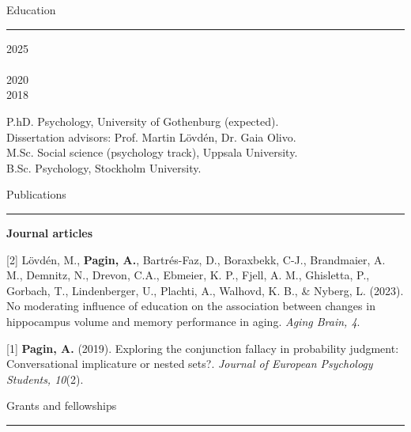 \documentclass[10pt]{article}
\newcommand{\RR}{\textcolor{grayrule}{\rule[3mm]{\textwidth}{0.5pt}}}
\begin{document}
{\large Education} \\
\vspace{-.3cm}\RR 

\begin{minipage}[t]{0.075\linewidth}
2025 \\ \\
2020 \\ 
2018
\end{minipage} 
\begin{minipage}[t]{0.92\linewidth}P.hD. Psychology, University of Gothenburg (expected).\\ 
{\footnotesize Dissertation advisors: Prof. Martin Lövdén, Dr. Gaia Olivo.} \\
M.Sc. Social science (psychology track), Uppsala University. \\
\normalsize B.Sc. Psychology, Stockholm University. \\
\end{minipage}

{\large Publications} \\
\vspace{-.3cm}\RR 

\textbf{Journal articles}

\begin{hangparas}{0.4in}{1}
\vspace{-0.6em}
[2] Lövdén, M., \textbf{Pagin, A.}, Bartrés-Faz, D., Boraxbekk, C-J., Brandmaier, A. M., Demnitz, N., Drevon, C.A., Ebmeier, K. P., Fjell, A. M., Ghisletta, P., Gorbach, T., Lindenberger, U., Plachti, A., Walhovd, K. B., \& Nyberg, L. (2023). No moderating influence of education on the association between changes in hippocampus volume and memory performance in aging. \emph{Aging Brain, 4}. %

[1] \textbf{Pagin, A.} (2019). Exploring the conjunction fallacy in probability judgment: Conversational implicature or nested sets?. \emph{Journal of European Psychology Students, 10}(2). \\
\end{hangparas}

{\large Grants and fellowships} \\
\vspace{-.3cm}\RR 
\end{document}
